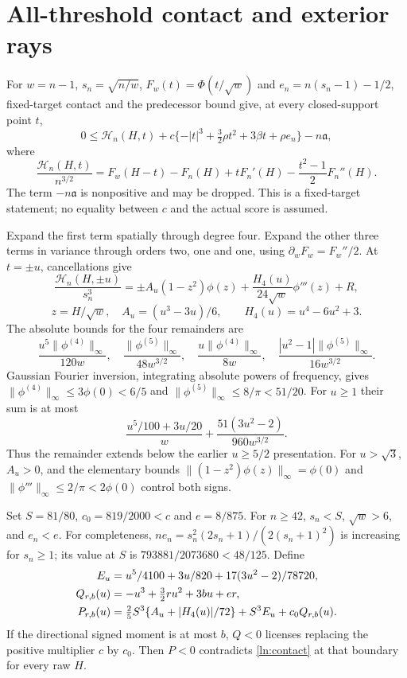 \documentclass[11pt]{article}
\begin{document}
\section{All-threshold contact and exterior rays}
For $w=n-1$, $s_n=\sqrt{n/w}$, $F_w(t)=\Phi(t/\sqrt w)$ and
$e_n=n(s_n-1)-1/2$, fixed-target contact and the predecessor bound give,
at every closed-support point $t$,
\begin{equation}\label{ln:contact}
 0\le\mathcal H_n(H,t)
       +c\{-|t|^3+\tfrac32\rho t^2+3\beta t+\rho e_n\}
       -n\mathfrak a,
\end{equation}
where
\[
 \frac{\mathcal H_n(H,t)}{n^{3/2}}
 =F_w(H-t)-F_n(H)+tF_n'(H)-\frac{t^2-1}{2}F_n''(H).
\]
The term $-n\mathfrak a$ is nonpositive and may be dropped. This is a
fixed-target statement; no equality between $c$ and the actual score is
assumed.

Expand the first term spatially through degree four. Expand the other
three terms in variance through orders two, one and one, using
$\partial_w F_w=F_w''/2$. At $t=\pm u$, cancellations give
\[
 \frac{\mathcal H_n(H,\pm u)}{s_n^3}
 =\pm A_u(1-z^2)\phi(z)
       +\frac{H_4(u)}{24\sqrt w}\phi'''(z)+R,
\]
\[
 z=H/\sqrt w,\quad A_u=(u^3-3u)/6,
 \qquad H_4(u)=u^4-6u^2+3.
\]
The absolute bounds for the four remainders are
\[
 \frac{u^5\|\phi^{(4)}\|_\infty}{120w},\quad
 \frac{\|\phi^{(5)}\|_\infty}{48w^{3/2}},\quad
 \frac{u\|\phi^{(4)}\|_\infty}{8w},\quad
 \frac{|u^2-1|\|\phi^{(5)}\|_\infty}{16w^{3/2}}.
\]
Gaussian Fourier inversion, integrating absolute powers of frequency,
gives $\|\phi^{(4)}\|_\infty\le3\phi(0)<6/5$ and
$\|\phi^{(5)}\|_\infty\le8/\pi<51/20$.
For $u\ge1$ their sum is at most
\[
 \frac{u^5/100+3u/20}{w}
      +\frac{51(3u^2-2)}{960w^{3/2}}.
\]
Thus the remainder extends below the earlier $u\ge5/2$ presentation.
For $u>\sqrt3$, $A_u>0$, and the elementary bounds
$\|(1-z^2)\phi(z)\|_\infty=\phi(0)$ and
$\|\phi'''\|_\infty\le2/\pi<2\phi(0)$ control both signs.

Set $S=81/80$, $c_0=819/2000<c$ and $e=8/875$.
For $n\ge42$, $s_n<S$, $\sqrt w>6$, and $e_n<e$.
For completeness,
$ne_n=s_n^2(2s_n+1)/(2(s_n+1)^2)$ is increasing for $s_n\ge1$;
its value at $S$ is $793881/2073680<48/125$.
Define
\begin{align}
 E_u&=u^5/4100+3u/820+17(3u^2-2)/78720,\notag\\
 Q_{r,b}(u)&=-u^3+\tfrac32ru^2+3bu+er,\label{ln:Q}\\
 P_{r,b}(u)&=\tfrac25S^3\{A_u+|H_4(u)|/72\}
                  +S^3 E_u+c_0Q_{r,b}(u).\label{ln:P}
\end{align}
If the directional signed moment is at most $b$, $Q<0$ licenses replacing
the positive multiplier $c$ by $c_0$. Then $P<0$ contradicts
\eqref{ln:contact} at that boundary for every raw $H$.
\end{document}
